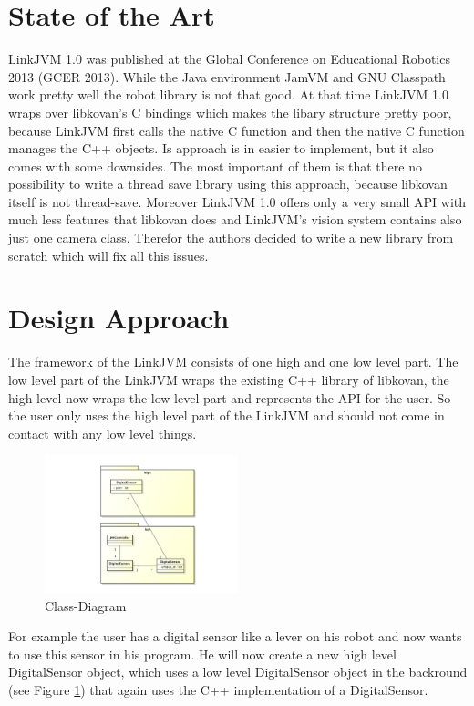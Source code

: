 \documentclass{juniorjournal}
\begin{document}
\section{State of the Art}
LinkJVM 1.0 was published at the Global Conference on Educational Robotics 2013 (GCER 2013).
While the Java environment JamVM and GNU Classpath work pretty well the robot library is not that good.
At that time LinkJVM 1.0 wraps over libkovan's C bindings which makes the libary structure pretty poor, because LinkJVM first calls the native C function and then the native C function manages the C++ objects.
Is approach is in easier to implement, but it also comes with some downsides.
The most important of them is that there no possibility to write a thread save library using this approach, because libkovan itself is not thread-save.
Moreover LinkJVM 1.0 offers only a very small API with much less features that libkovan does and LinkJVM's vision system contains also just one camera class.
Therefor the authors decided to write a new library from scratch which will fix all this issues. 

\section{Design Approach}
The framework of the LinkJVM consists of one high and one low level part.
The low level part of the LinkJVM wraps the existing C++ library of libkovan, 
the high level now wraps the low level part and represents the API for the user.
So the user only uses the high level part of the LinkJVM and should not come in 
contact with any low level things.

\begin{figure}[htbp]
\centering
\includegraphics[width=0.5\textwidth]{images/Class-Diagram.pdf}
\caption{Class-Diagram}
\label{fig:Class-Diagram}
\end{figure}

For example the user has a digital sensor like a lever on his robot and now 
wants to use this sensor in his program. He will now create a new high level 
DigitalSensor object, which uses a low level DigitalSensor object in the 
backround (see Figure \ref{fig:Class-Diagram}) that again uses the C++ implementation of a DigitalSensor.
\end{document}
